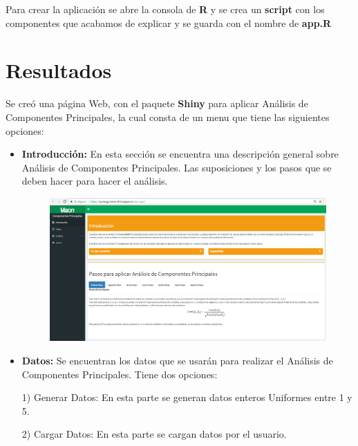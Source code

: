 \documentclass[12pt,letterpaper]{report} %
\begin{document}
Para crear la aplicación se abre la consola de \textbf{R} y se crea un \textbf{script} con los componentes que acabamos de explicar y se guarda con el nombre de \textbf{app.R}

\chapter{Resultados}

Se creó una página Web, con el paquete \textbf{Shiny} para aplicar Análisis de Componentes Principales, la cual consta de un menu que tiene las siguientes opciones:

\begin{itemize}
	\item \textbf{Introducción:} En esta sección se encuentra una descripción general sobre Análisis de Componentes Principales. Las suposiciones y los pasos que se deben hacer para hacer el análisis.

\begin{figure}[H]
\begin{center}
\includegraphics[width=15 cm,height=10 cm]{img/Introduccion.png}
\end{center}
\end{figure}

\item \textbf{Datos:} Se encuentran los datos que se usarán para realizar el Análisis de Componentes Principales. 
Tiene dos opciones: 
  
1) Generar Datos: En esta parte se generan datos enteros Uniformes entre 1 y 5. 

2) Cargar Datos: En esta parte se cargan datos por el usuario.


\end{itemize}
\end{document}
